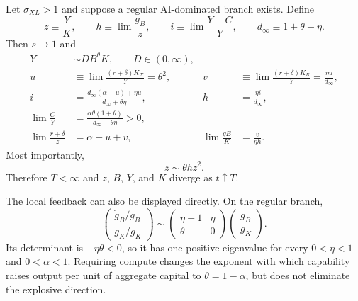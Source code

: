 \begin{proposition}
\label{prop:substitute-singularity}
Let $\sigma_{XL}>1$ and suppose a regular AI-dominated branch exists. Define
\begin{equation}
 z\equiv\frac{Y}{K},\qquad
 h\equiv\lim\frac{g_B}{z},\qquad
 i\equiv\lim\frac{Y-C}{Y},\qquad
 d_\infty\equiv1+\theta-\eta.
 \label{eq:sub-definitions}
\end{equation}
Then $s\to1$ and
\begin{align}
 Y&\sim D B^\theta K,\qquad D\in(0,\infty),
 \label{eq:sub-production}\\
 u&\equiv\lim\frac{(r+\delta)K_X}{Y}=\theta^2,
 &v&\equiv\lim\frac{(r+\delta)K_R}{Y}
 =\frac{\eta u}{d_\infty},
 \label{eq:sub-uv}\\
 i&=\frac{d_\infty(\alpha+u)+\eta u}
 {d_\infty+\theta\eta},
 &h&=\frac{\eta i}{d_\infty},
 \label{eq:sub-ih}\\
 \lim\frac{C}{Y}
 &=\frac{\alpha\theta(1+\theta)}
 {d_\infty+\theta\eta}>0,
 \label{eq:sub-c}\\
 \lim\frac{r+\delta}{z}&=\alpha+u+v,
 &\lim\frac{qB}{K}&=\frac{v}{\eta h}.
 \label{eq:sub-price-q}
\end{align}
Most importantly,
\begin{equation}
 \dot z\sim\theta h z^2.
 \label{eq:z-Riccati}
\end{equation}
Therefore $T<\infty$ and $z$, $B$, $Y$, and $K$ diverge as $t\uparrow T$.
\end{proposition}

The local feedback can also be displayed directly. On the regular branch,
\begin{equation}
 \begin{pmatrix}
  \dot g_B/g_B\\[2pt]
  \dot g_K/g_K
 \end{pmatrix}
 \sim
 \begin{pmatrix}
  \eta-1&\eta\\
  \theta&0
 \end{pmatrix}
 \begin{pmatrix}g_B\\ g_K\end{pmatrix}.
 \label{eq:sub-feedback-matrix}
\end{equation}
Its determinant is $-\eta\theta<0$, so it has one positive eigenvalue for every $0<\eta<1$ and $0<\alpha<1$. Requiring compute changes the exponent with which capability raises output per unit of aggregate capital to $\theta=1-\alpha$, but does not eliminate the explosive direction.

